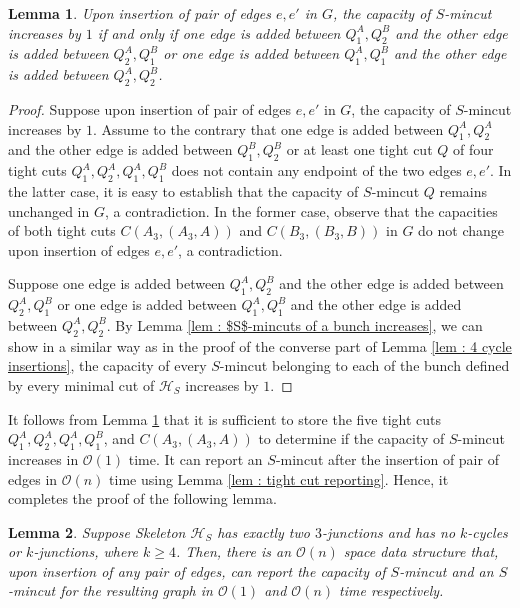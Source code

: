 \documentclass[letterpaper,11pt]{article}
\newtheorem{lemma}{Lemma}[]
\begin{document}
\begin{lemma} \label{lem : case 2 main lemma}
    Upon insertion of pair of edges $e,e'$ in $G$, the capacity of $S$-mincut increases by $1$ if and only if one edge is added between $Q_1^A,Q_2^B$ and the other edge is added between $Q_2^A,Q_1^B$ or one edge is added between $Q_1^A,Q_1^B$ and the other edge is added between $Q_2^A,Q_2^B$.  
\end{lemma}
\begin{proof}
    Suppose upon insertion of pair of edges $e,e'$ in $G$, the capacity of $S$-mincut increases by $1$. Assume to the contrary that one edge is added between $Q_1^A,Q_2^A$ and the other edge is added between $Q_1^B,Q_2^B$ or at least one tight cut $Q$ of four tight cuts $Q_1^A,Q_2^A,Q_1^A,Q_1^B$ does not contain any endpoint of the two edges $e,e'$. In the latter case, it is easy to establish that the capacity of $S$-mincut $Q$ remains unchanged in $G$, a contradiction. In the former case, observe that the capacities of both tight cuts $C(A_3,(A_3,A))$ and $C(B_3,(B_3,B))$ in $G$ do not change upon insertion of edges $e,e'$, a contradiction.

    Suppose one edge is added between $Q_1^A,Q_2^B$ and the other edge is added between $Q_2^A,Q_1^B$ or one edge is added between $Q_1^A,Q_1^B$ and the other edge is added between $Q_2^A,Q_2^B$. By Lemma \ref{lem : $S$-mincuts of a bunch increases}, we can show in a similar way as in the proof of the converse part of Lemma \ref{lem : 4 cycle insertions}, the capacity of every $S$-mincut belonging to each of the bunch defined by every minimal cut of ${\mathcal H}_S$ increases by $1$. 
\end{proof}
It follows from Lemma \ref{lem : case 2 main lemma} that it is sufficient to store the five tight cuts $Q_1^A,Q_2^A,Q_1^A,Q_1^B$, and $C(A_3,(A_3,A))$ to determine if the capacity of $S$-mincut increases in ${\mathcal O}(1)$ time. It can report an $S$-mincut after the insertion of pair of edges in ${\mathcal O}(n)$ time using Lemma \ref{lem : tight cut reporting}. 
Hence, it completes the proof of the following lemma.
\begin{lemma} \label{lem : case 2}
    Suppose Skeleton ${\mathcal H}_S$ has exactly two $3$-junctions and has no $k$-cycles or $k$-junctions, where $k\ge 4$. Then, there is an ${\mathcal O}(n)$ space data structure that, upon insertion of any pair of edges, can report the capacity of $S$-mincut and an $S$-mincut for the resulting graph in ${\mathcal O}(1)$ and ${\mathcal O}(n)$ time respectively.
\end{lemma}
\end{document}
